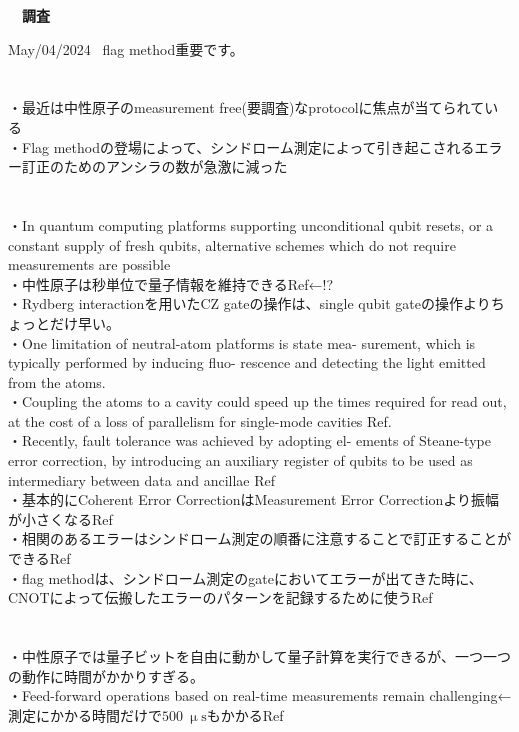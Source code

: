 \documentclass[a4paper,10.5pt]{ltjsarticle}
\begin{document}
\centerline
{\huge \bfseries　調査}
\rightline
{May/04/2024}
\leftline
{}
\ flag method重要です。\\
\\
\\
・最近は中性原子のmeasurement free(要調査)なprotocolに焦点が当てられている\\
・Flag methodの登場によって、シンドローム測定によって引き起こされるエラー訂正のためのアンシラの数が急激に減った\\
\\
\\
・In quantum computing platforms supporting unconditional qubit resets, or a constant supply of fresh qubits, alternative schemes which do not require measurements are possible\\
・中性原子は秒単位で量子情報を維持できるRef\cite{1}←!?\\
・Rydberg interactionを用いたCZ gateの操作は、single qubit gateの操作よりちょっとだけ早い。\\
・One limitation of neutral-atom platforms is state mea- surement, which is typically performed by inducing fluo- rescence and detecting the light emitted from the atoms.\\
・Coupling the atoms to a cavity could speed up the times required for read out, at the cost of a loss of parallelism for single-mode cavities Ref\cite{2}\cite{3}.\\
・Recently, fault tolerance was achieved by adopting el- ements of Steane-type error correction, by introducing an auxiliary register of qubits to be used as intermediary between data and ancillae Ref\cite{4}\\
・基本的にCoherent Error CorrectionはMeasurement Error Correctionより振幅が小さくなるRef\cite{5}\\
・相関のあるエラーはシンドローム測定の順番に注意することで訂正することができるRef\cite{6}\\
・flag methodは、シンドローム測定のgateにおいてエラーが出てきた時に、CNOTによって伝搬したエラーのパターンを記録するために使うRef\cite{7}\\
\\
\\
・中性原子では量子ビットを自由に動かして量子計算を実行できるが、一つ一つの動作に時間がかかりすぎる。\\
・Feed-forward operations based on real-time measurements remain challenging←測定にかかる時間だけで$500\ \mathrm{\upmu s}$もかかるRef\cite{1}\\
\end{document}
